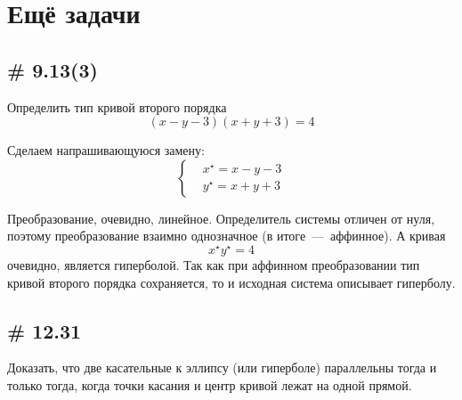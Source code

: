 \documentclass[a4paper,12pt]{article}
\begin{document}
  
  \section{Ещё задачи}
  
  \subsection{\# 9.13(3)}
  
  Определить тип кривой второго порядка
  \[
    (x - y - 3)(x + y + 3) = 4
  \]
  
  \begin{solution}
    Сделаем напрашивающуюся замену:
    \[
      \left\{
        \begin{aligned}
          &x^\star = x - y - 3\\
          &y^\star = x + y + 3
        \end{aligned}
      \right.
    \]
    
    Преобразование, очевидно, линейное.
    Определитель системы отличен от нуля, поэтому преобразование взаимно однозначное (в итоге~---~аффинное).
    А кривая
    \[
      x^\star y^\star = 4
    \]
    очевидно, является гиперболой.
    Так как при аффинном преобразовании тип кривой второго порядка сохраняется, то и исходная система описывает гиперболу.
  \end{solution}
  
  
  \subsection{\# 12.31}
  
  Доказать, что две касательные к эллипсу (или гиперболе) параллельны тогда и только тогда, когда точки касания и центр кривой лежат на одной прямой.
  
\end{document}
